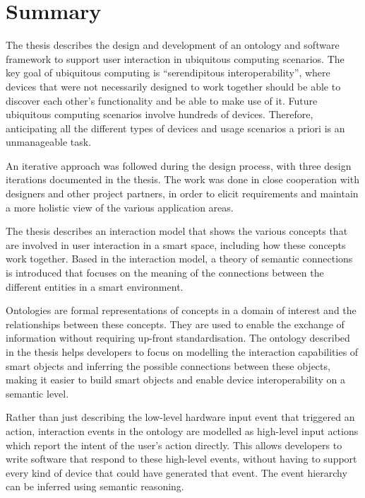 \cleardoublepage
\pagestyle{empty}

\begingroup
\let\clearpage\relax
\let\cleardoublepage\relax
\let\cleardoublepage\relax

\chapter*{Summary}
The thesis describes the design and development of an ontology and software framework to support user interaction in ubiquitous computing scenarios. The key goal of ubiquitous computing is ``serendipitous interoperability'', where devices that were not necessarily designed to work together should be able to discover each other's functionality and be able to make use of it. Future ubiquitous computing scenarios involve hundreds of devices. Therefore, anticipating all the different types of devices and usage scenarios a priori is an unmanageable task.

An iterative approach was followed during the design process, with three design iterations documented in the thesis. The work was done in close cooperation with designers and other project partners, in order to elicit requirements and maintain a more holistic view of the various application areas.
 
The thesis describes an interaction model that shows the various concepts that are involved in user interaction in a smart space, including how these concepts work together. Based in the interaction model, a theory of semantic connections is introduced that focuses on the meaning of the connections between the different entities in a smart environment.

Ontologies are formal representations of concepts in a domain of interest and the relationships between these concepts. They are used to enable the exchange of information without requiring up-front standardisation. The ontology described in the thesis helps developers to focus on modelling the interaction capabilities of smart objects and inferring the possible connections between these objects, making it easier to build smart objects and enable device interoperability on a semantic level.

Rather than just describing the low-level hardware input event that triggered an action, interaction events in the ontology are modelled as high-level input actions which report the intent of the user's action directly. This allows developers to write software that respond to these high-level events, without having to support every kind of device that could have generated that event. The event hierarchy can be inferred using semantic reasoning.

